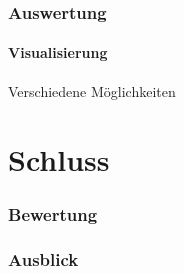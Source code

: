\documentclass{beamer}
\begin{document}
\begin{frame}
\frametitle{Auswertung}
\framesubtitle{Visualisierung}
Verschiedene Möglichkeiten

\end{frame}

\section{Schluss}
\frame{\tableofcontents[currentsection]}

\begin{frame}
\frametitle{Bewertung}

\end{frame}

\begin{frame}
\frametitle{Ausblick}

\end{frame}
\end{document}
